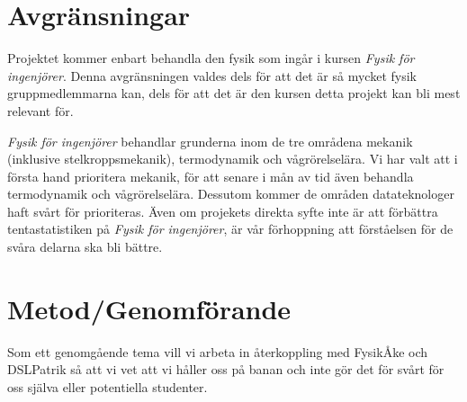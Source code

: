 \documentclass[12pt,a4paper]{article}
\begin{document}
\section{Avgränsningar}

Projektet kommer enbart behandla den fysik som ingår i kursen \textit{Fysik för ingenjörer}. Denna avgränsningen valdes dels för att det är så mycket fysik gruppmedlemmarna kan, dels för att det är den kursen detta projekt kan bli mest relevant för.

\textit{Fysik för ingenjörer} behandlar grunderna inom de tre områdena mekanik (inklusive stelkroppsmekanik), termodynamik och vågrörelselära. Vi har valt att i första hand prioritera mekanik, för att senare i mån av tid även behandla termodynamik och vågrörelselära. Dessutom kommer de områden datateknologer haft svårt för prioriteras. Även om projekets direkta syfte inte är att förbättra tentastatistiken på \textit{Fysik för ingenjörer}, är vår förhoppning att förståelsen för de svåra delarna ska bli bättre.







\section{Metod/Genomförande}

Som ett genomgående tema vill vi arbeta in återkoppling med FysikÅke och DSLPatrik så att vi vet att vi håller oss på banan och inte gör det för svårt för oss själva eller potentiella studenter.
\end{document}

